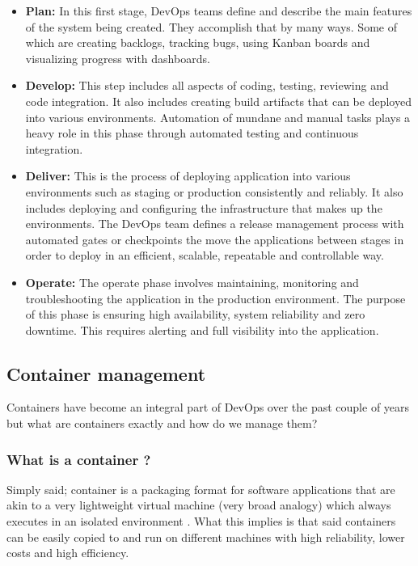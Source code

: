 \begin{itemize}
    \item \textbf{Plan:} In this first stage, DevOps teams define and describe the main features of the system being created. They accomplish that by many ways. Some of which are creating backlogs, tracking bugs, using Kanban boards and visualizing progress with dashboards.
    \item \textbf{Develop:} This step includes all aspects of coding, testing, reviewing and code integration. It also includes creating build artifacts that can be deployed into various environments. Automation of mundane and manual tasks plays a heavy role in this phase through automated testing and continuous integration.
    \item \textbf{Deliver:} This is the process of deploying application into various environments such as staging or production consistently and reliably. It also includes deploying and configuring the infrastructure that makes up the environments. The DevOps team defines a release management process with automated gates or checkpoints the move the applications between stages in order to deploy in an efficient, scalable, repeatable and controllable way.
    \item \textbf{Operate:} The operate phase involves maintaining, monitoring and troubleshooting the application in the production environment. The purpose of this phase is ensuring high availability, system reliability and zero downtime. This requires alerting and full visibility into the application.
\end{itemize}

\subsection{Container management}
Containers have become an integral part of DevOps over the past couple of years but what are containers exactly and how do we manage them?

\subsubsection*{What is a container ?}
Simply said; container is a packaging format for software applications that are akin to a very lightweight virtual machine (very broad analogy) which always executes in an isolated environment \cite{what-is-a-container}.
What this implies is that said containers can be easily copied to and run on different machines with high reliability, lower costs and high efficiency.

